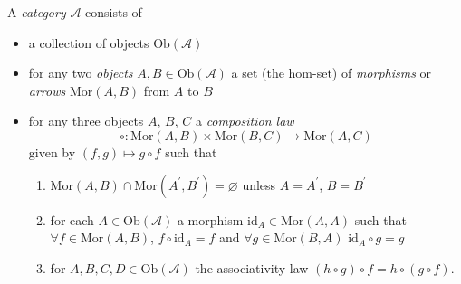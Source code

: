 \begin{defn}[Category]
A \emph{category} $\mathscr{A}$ consists of
\begin{itemize}
  \item{
    a collection of objects $\mathrm{Ob}(\mathscr{A})$
  }
  \item{
    for any two \emph{objects} $A, B \in \mathrm{Ob}(\mathscr{A})$
    a set (the hom-set) of \emph{morphisms} or \emph{arrows}
    $\mathrm{Mor}(A, B)$ from $A$ to $B$
  }
  \item{
    for any three objects $A$, $B$, $C$ a \emph{composition law}
    $$
    \circ : \mathrm{Mor}(A, B) \times \mathrm{Mor}(B, C) \to
    \mathrm{Mor}(A, C)
    $$
    given by $(f, g) \mapsto g \circ f$ such that
    \begin{enumerate}
      \item{
        $\mathrm{Mor}(A, B) \cap \mathrm{Mor}(A^\prime, B^\prime) =
        \varnothing$ unless $A = A^\prime$, $B = B^\prime$
      }
      \item{
        for each $A \in \mathrm{Ob}(\mathscr{A})$ a morphism
        $\mathrm{id}_A \in \mathrm{Mor}(A, A)$ such that
        $\forall f \in \mathrm{Mor}(A, B)$, $f \circ \mathrm{id}_A =
        f$
        and $\forall g \in \mathrm{Mor}(B, A)$
        $\mathrm{id}_A \circ g = g$
      }
      \item{
        for $A, B, C, D \in \mathrm{Ob}(\mathscr{A})$ the
        associativity law $(h \circ g) \circ f = h \circ (g \circ f)$.
      }
    \end{enumerate}
  }
\end{itemize}
\end{defn}

